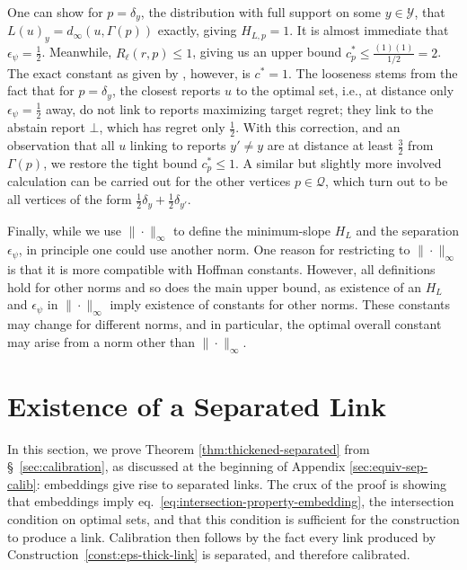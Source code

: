 \documentclass[twoside,11pt]{article}
\newcommand{\Y}{\mathcal{Y}}
\begin{document}
One can show for $p = \delta_y$, the distribution with full support on some $y \in \Y$, that $L(u)_y = d_{\infty}(u,\Gamma(p))$ exactly, giving $H_{L,p} = 1$.
It is almost immediate that $\epsilon_{\psi} = \tfrac{1}{2}$.
Meanwhile, $R_{\ell}(r,p) \leq 1$, giving us an upper bound $c^*_p \leq \frac{(1)(1)}{1/2} = 2$.
The exact constant as given by \citeauthor{ramaswamy2018consistent}, however, is $c^* = 1$.
The looseness stems from the fact that for $p = \delta_y$, the closest reports $u$ to the optimal set, i.e., at distance only $\epsilon_{\psi} = \tfrac{1}{2}$ away, do not link to reports maximizing target regret; they link to the abstain report $\bot$, which has regret only $\tfrac{1}{2}$.
With this correction, and an observation that all $u$ linking to reports $y' \neq y$ are at distance at least $\tfrac{3}{2}$ from $\Gamma(p)$, we restore the tight bound $c^*_p \leq 1$.
A similar but slightly more involved calculation can be carried out for the other vertices $p \in \mathcal{Q}$, which turn out to be all vertices of the form $\tfrac{1}{2} \delta_y + \tfrac{1}{2} \delta_{y'}$.

Finally, while we use $\|\cdot\|_{\infty}$ to define the minimum-slope $H_L$ and the separation $\epsilon_\psi$, in principle one could use another norm.
One reason for restricting to $\|\cdot\|_\infty$ is that it is more compatible with Hoffman constants.
However, all definitions hold for other norms and so does the main upper bound, as existence of an $H_L$ and $\epsilon_{\psi}$ in $\|\cdot\|_{\infty}$ imply existence of constants for other norms.
These constants may change for different norms, and in particular, the optimal overall constant may arise from a norm other than $\|\cdot\|_\infty$.




\section{Existence of a Separated Link} \label{app:sep-link-exists}
In this section, we prove Theorem \ref{thm:thickened-separated} from \S~\ref{sec:calibration}, as discussed at the beginning of Appendix \ref{sec:equiv-sep-calib}: embeddings give rise to separated links.
The crux of the proof is showing that embeddings imply eq.~\eqref{eq:intersection-property-embedding}, the intersection condition on optimal sets, and that this condition is sufficient for the construction to produce a link.
Calibration then follows by the fact every link produced by Construction~\ref{const:eps-thick-link} is separated, and therefore calibrated.
\end{document}
